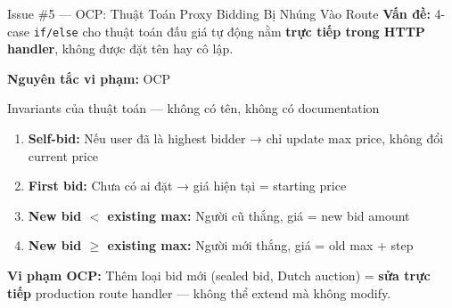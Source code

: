 \documentclass[12pt]{beamer}
\begin{document}
\begin{frame}{Issue \#5 — OCP: Thuật Toán Proxy Bidding Bị Nhúng Vào Route}
  \textbf{Vấn đề:} 4-case \texttt{if/else} cho thuật toán đấu giá tự động nằm \textbf{trực tiếp trong HTTP handler}, không được đặt tên hay cô lập.

  \bigskip
  \textbf{Nguyên tắc vi phạm:} \alert{OCP}

  \bigskip
  \begin{alertblock}{Invariants của thuật toán — không có tên, không có documentation}
    \begin{enumerate}
      \item \textbf{Self-bid:} Nếu user đã là highest bidder → chỉ update max price, không đổi current price
      \item \textbf{First bid:} Chưa có ai đặt → giá hiện tại = starting price
      \item \textbf{New bid $<$ existing max:} Người cũ thắng, giá = new bid amount
      \item \textbf{New bid $\geq$ existing max:} Người mới thắng, giá = old max + step
    \end{enumerate}
  \end{alertblock}

  \bigskip
  \textbf{Vi phạm OCP:} Thêm loại bid mới (sealed bid, Dutch auction) = \textbf{sửa trực tiếp} production route handler — không thể extend mà không modify.
\end{frame}
\end{document}
